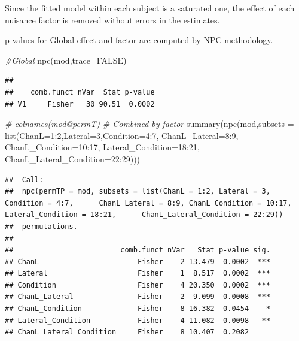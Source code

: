 \documentclass[
]{article}
\newenvironment{Shaded}{\begin{snugshade}}{\end{snugshade}}
\newcommand{\AttributeTok}[1]{\textcolor[rgb]{0.77,0.63,0.00}{#1}}
\newcommand{\CommentTok}[1]{\textcolor[rgb]{0.56,0.35,0.01}{\textit{#1}}}
\newcommand{\ConstantTok}[1]{\textcolor[rgb]{0.00,0.00,0.00}{#1}}
\newcommand{\DecValTok}[1]{\textcolor[rgb]{0.00,0.00,0.81}{#1}}
\newcommand{\FunctionTok}[1]{\textcolor[rgb]{0.00,0.00,0.00}{#1}}
\newcommand{\NormalTok}[1]{#1}
\newcommand{\SpecialCharTok}[1]{\textcolor[rgb]{0.00,0.00,0.00}{#1}}
\begin{document}
Since the fitted model within each subject is a saturated one, the
effect of each nuisance factor is removed without errors in the
estimates.

p-values for Global effect and factor are computed by NPC methodology.

\begin{Shaded}
\begin{Highlighting}[]
\CommentTok{\#Global}
\FunctionTok{npc}\NormalTok{(mod,}\AttributeTok{trace=}\ConstantTok{FALSE}\NormalTok{)}
\end{Highlighting}
\end{Shaded}

\begin{verbatim}
## 
##    comb.funct nVar  Stat p-value
## V1     Fisher   30 90.51  0.0002
\end{verbatim}

\begin{Shaded}
\begin{Highlighting}[]
\CommentTok{\# colnames(mod@permT)}
\CommentTok{\# Combined by factor}
\FunctionTok{summary}\NormalTok{(}\FunctionTok{npc}\NormalTok{(mod,}\AttributeTok{subsets =} \FunctionTok{list}\NormalTok{(}\AttributeTok{ChanL=}\DecValTok{1}\SpecialCharTok{:}\DecValTok{2}\NormalTok{,}\AttributeTok{Lateral=}\DecValTok{3}\NormalTok{,}\AttributeTok{Condition=}\DecValTok{4}\SpecialCharTok{:}\DecValTok{7}\NormalTok{,}
                       \AttributeTok{ChanL\_Lateral=}\DecValTok{8}\SpecialCharTok{:}\DecValTok{9}\NormalTok{,}
                       \AttributeTok{ChanL\_Condition=}\DecValTok{10}\SpecialCharTok{:}\DecValTok{17}\NormalTok{,}
                       \AttributeTok{Lateral\_Condition=}\DecValTok{18}\SpecialCharTok{:}\DecValTok{21}\NormalTok{,}
                       \AttributeTok{ChanL\_Lateral\_Condition=}\DecValTok{22}\SpecialCharTok{:}\DecValTok{29}\NormalTok{)))}
\end{Highlighting}
\end{Shaded}

\begin{verbatim}
##  Call:
##  npc(permTP = mod, subsets = list(ChanL = 1:2, Lateral = 3, Condition = 4:7,      ChanL_Lateral = 8:9, ChanL_Condition = 10:17, Lateral_Condition = 18:21,      ChanL_Lateral_Condition = 22:29)) 
##  permutations.
## 
##                         comb.funct nVar   Stat p-value sig.
## ChanL                       Fisher    2 13.479  0.0002  ***
## Lateral                     Fisher    1  8.517  0.0002  ***
## Condition                   Fisher    4 20.350  0.0002  ***
## ChanL_Lateral               Fisher    2  9.099  0.0008  ***
## ChanL_Condition             Fisher    8 16.382  0.0454    *
## Lateral_Condition           Fisher    4 11.082  0.0098   **
## ChanL_Lateral_Condition     Fisher    8 10.407  0.2082
\end{verbatim}
\end{document}
